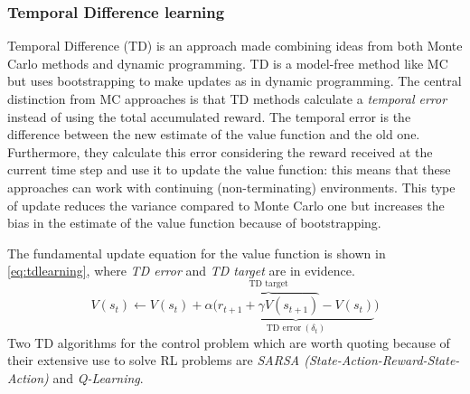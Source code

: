 \subsubsection{Temporal Difference learning} \label{tdlearn}

Temporal Difference (TD) is an approach made combining ideas from both Monte Carlo methods and dynamic programming.
TD is a model-free method like MC but uses bootstrapping to make updates as in dynamic programming.
The central distinction from MC approaches is that TD methods calculate a \textit{temporal error} instead of using the total accumulated reward.
The temporal error is the difference between the new estimate of the value function and the old one.
Furthermore, they calculate this error considering the reward received at the current time step and use it to update the value function: this means that these approaches can work with continuing (non-terminating) environments.
This type of update reduces the variance compared to Monte Carlo one but increases the bias in the estimate of the value function because of bootstrapping.

The fundamental update equation for the value function is shown in \vref{eq:tdlearning}, where \textit{TD error} and \textit{TD target} are in evidence.
\begin{equation}\label{eq:tdlearning}
	V(s_t) \leftarrow V(s_t) + \alpha \big(\underbrace{\overbrace{r_{t+1} + \gamma V(s_{t+1})}^{\text{TD target}}- V(s_t)}_{\text{TD error} \ (\delta_t)}\big)
\end{equation}
Two TD algorithms for the control problem which are worth quoting because of their extensive use to solve RL problems are \textit{SARSA (State-Action-Reward-State-Action)} and \textit{Q-Learning}.

